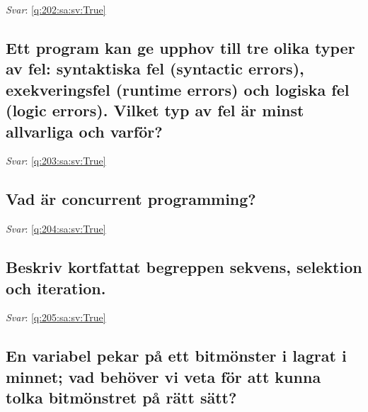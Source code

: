 \documentclass[a4paper,11pt,oneside]{article}
\begin{document}
\begin{sloppypar}
\textit{Svar}: \autoref{q:202:sa:sv:True}



\subsection{Ett program kan ge upphov till tre olika typer av fel: syntaktiska fel (syntactic errors), exekveringsfel (runtime errors) och logiska fel (logic errors). Vilket typ av fel \"ar minst allvarliga och varf\"or?}

\label{q:203:sa:sv:False}

\vspace{2cm}

\noindent\makebox[\textwidth]{\hrulefill}

\vspace{1cm}

\textit{Svar}: \autoref{q:203:sa:sv:True}



\subsection{Vad \"ar concurrent programming?}

\label{q:204:sa:sv:False}

\vspace{2cm}

\noindent\makebox[\textwidth]{\hrulefill}

\vspace{1cm}

\textit{Svar}: \autoref{q:204:sa:sv:True}



\subsection{Beskriv kortfattat begreppen sekvens, selektion och iteration.}

\label{q:205:sa:sv:False}

\vspace{2cm}

\noindent\makebox[\textwidth]{\hrulefill}

\vspace{1cm}

\textit{Svar}: \autoref{q:205:sa:sv:True}



\subsection{En variabel pekar p\r{a} ett bitm\"onster i lagrat i minnet; vad beh\"over vi veta f\"or att kunna tolka bitm\"onstret p\r{a} r\"att s\"att?}


\end{sloppypar}
\end{document}
